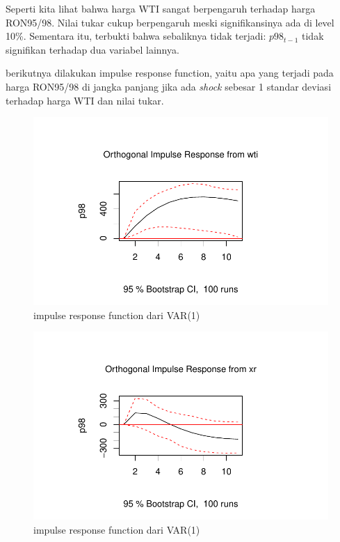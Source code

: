 \documentclass[
  a4paper,
  DIV=11,
  numbers=noendperiod]{scrreprt}
\begin{document}
Seperti kita lihat bahwa harga WTI sangat berpengaruh terhadap harga
RON95/98. Nilai tukar cukup berpengaruh meski signifikansinya ada di
level 10\%. Sementara itu, terbukti bahwa sebaliknya tidak terjadi:
\(p98_{t-1}\) tidak signifikan terhadap dua variabel lainnya.

berikutnya dilakukan impulse response function, yaitu apa yang terjadi
pada harga RON95/98 di jangka panjang jika ada \emph{shock} sebesar 1
standar deviasi terhadap harga WTI dan nilai tukar.

\begin{figure}

{\centering \includegraphics{index_files/figure-pdf/fig-irf-1.pdf}

}

\caption{\label{fig-irf-1}impulse response function dari VAR(1)}

\end{figure}

\begin{figure}

{\centering \includegraphics{index_files/figure-pdf/fig-irf-2.pdf}

}

\caption{\label{fig-irf-2}impulse response function dari VAR(1)}

\end{figure}
\end{document}
